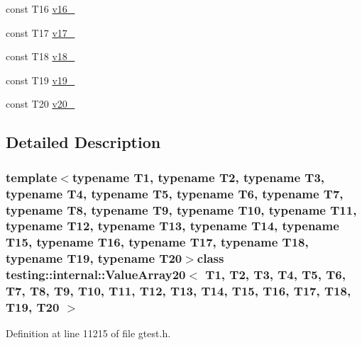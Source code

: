 \begin{DoxyCompactItemize}
\item 
const \-T16 \hyperlink{classtesting_1_1internal_1_1ValueArray20_a8b2b80d31925c1583c3e694d2bf235c5}{v16\-\_\-}
\item 
const \-T17 \hyperlink{classtesting_1_1internal_1_1ValueArray20_a9f59ea9e6f3642f77227dd1f7882d649}{v17\-\_\-}
\item 
const \-T18 \hyperlink{classtesting_1_1internal_1_1ValueArray20_ad07972ee98135c8deb090fc891a04e3e}{v18\-\_\-}
\item 
const \-T19 \hyperlink{classtesting_1_1internal_1_1ValueArray20_a3ad77b5b43c14332dabc9d47c8907e7f}{v19\-\_\-}
\item 
const \-T20 \hyperlink{classtesting_1_1internal_1_1ValueArray20_adb43992f7b5f5f07e0187003b8c9c872}{v20\-\_\-}
\end{DoxyCompactItemize}


\subsection{\-Detailed \-Description}
\subsubsection*{template$<$typename T1, typename T2, typename T3, typename T4, typename T5, typename T6, typename T7, typename T8, typename T9, typename T10, typename T11, typename T12, typename T13, typename T14, typename T15, typename T16, typename T17, typename T18, typename T19, typename T20$>$class testing\-::internal\-::\-Value\-Array20$<$ T1, T2, T3, T4, T5, T6, T7, T8, T9, T10, T11, T12, T13, T14, T15, T16, T17, T18, T19, T20 $>$}



\-Definition at line 11215 of file gtest.\-h.



